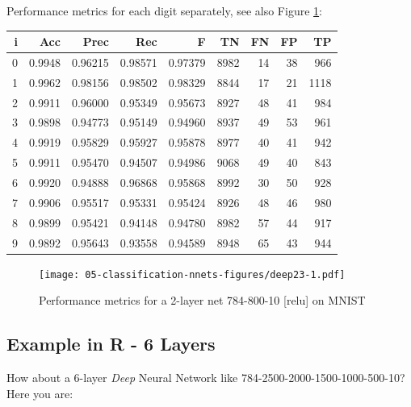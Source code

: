 \documentclass[10pt,b5paper,krantz1]{krantz}
\begin{document}
Performance metrics for each digit separately,
see also Figure \ref{fig:deep23}:

\begin{longtable}[]{@{}rrrrrrrrr@{}}
\toprule
i & Acc & Prec & Rec & F & TN & FN & FP & TP\tabularnewline
\midrule
\endhead
0 & 0.9948 & 0.96215 & 0.98571 & 0.97379 & 8982 & 14 & 38 & 966\tabularnewline
1 & 0.9962 & 0.98156 & 0.98502 & 0.98329 & 8844 & 17 & 21 & 1118\tabularnewline
2 & 0.9911 & 0.96000 & 0.95349 & 0.95673 & 8927 & 48 & 41 & 984\tabularnewline
3 & 0.9898 & 0.94773 & 0.95149 & 0.94960 & 8937 & 49 & 53 & 961\tabularnewline
4 & 0.9919 & 0.95829 & 0.95927 & 0.95878 & 8977 & 40 & 41 & 942\tabularnewline
5 & 0.9911 & 0.95470 & 0.94507 & 0.94986 & 9068 & 49 & 40 & 843\tabularnewline
6 & 0.9920 & 0.94888 & 0.96868 & 0.95868 & 8992 & 30 & 50 & 928\tabularnewline
7 & 0.9906 & 0.95517 & 0.95331 & 0.95424 & 8926 & 48 & 46 & 980\tabularnewline
8 & 0.9899 & 0.95421 & 0.94148 & 0.94780 & 8982 & 57 & 44 & 917\tabularnewline
9 & 0.9892 & 0.95643 & 0.93558 & 0.94589 & 8948 & 65 & 43 & 944\tabularnewline
\bottomrule
\end{longtable}

\begin{figure}
\hypertarget{fig:deep23}{%
\centering
\texttt{[image: 05-classification-nnets-figures/deep23-1.pdf]}
\caption{Performance metrics for a 2-layer net 784-800-10 {[}relu{]} on MNIST}\label{fig:deep23}
}
\end{figure}

\hypertarget{example-in-r---6-layers}{%
\subsection{Example in R - 6 Layers}\label{example-in-r---6-layers}}

How about a 6-layer \emph{Deep} Neural Network
like 784-2500-2000-1500-1000-500-10? Here you are:
\end{document}
